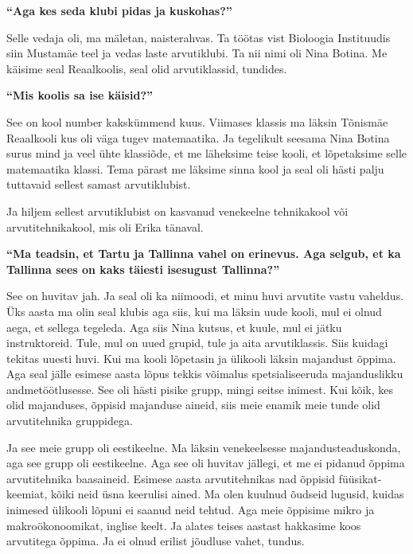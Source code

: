 \textbf{\enquote{Aga kes seda klubi pidas ja kuskohas?}}

Selle vedaja oli, ma mäletan, naisterahvas. Ta töötas vist Bioloogia
Instituudis siin Mustamäe teel ja vedas laste arvutiklubi. Ta nii nimi oli
Nina Botina. Me käisime seal
Reaalkoolis, seal olid arvutiklassid, tundides.

\textbf{\enquote{Mis koolis sa ise käisid?}}

See on kool number kakskümmend kuus. 
Viimases klassis ma läksin Tõnismäe Reaalkooli 
kus oli väga tugev matemaatika. Ja tegelikult seesama Nina Botina surus mind ja 
veel ühte klassiõde, et me läheksime teise kooli, et lõpetaksime selle 
matemaatika klassi. Tema pärast me läksime sinna kool ja seal oli hästi palju  
tuttavaid sellest samast arvutiklubist.

Ja hiljem sellest arvutiklubist on kasvanud venekeelne tehnikakool või
arvutitehnikakool, mis oli Erika tänaval. 

\textbf{\enquote{Ma teadsin, et Tartu ja Tallinna vahel on erinevus. Aga 
selgub, et ka Tallinna sees on kaks täiesti isesugust Tallinna?}}

See on huvitav jah. Ja seal oli ka niimoodi, et minu huvi arvutite vastu 
vaheldus. Üks aasta ma olin seal klubis aga siis, kui ma läksin uude kooli, mul 
ei olnud aega, et  sellega tegeleda. Aga siis Nina kutsus, et kuule,  mul ei 
jätku instruktoreid. Tule, mul on uued grupid, tule ja aita 
arvutiklassis. Siis kuidagi  tekitas uuesti huvi. Kui ma kooli lõpetasin ja  
ülikooli läksin majandust õppima. Aga seal jälle  esimese aasta lõpus tekkis 
võimalus spetsialiseeruda majanduslikku andmetöötlusesse. See oli hästi pisike 
grupp, mingi seitse inimest. Kui kõik, kes olid majanduses, õppisid majanduse 
aineid, siis meie enamik meie tunde olid  arvutitehnika gruppidega.

Ja see meie grupp oli eestikeelne. Ma läksin venekeelsesse majandusteaduskonda, 
aga see grupp oli eestikeelne. Aga
see oli huvitav jällegi, et me ei pidanud õppima arvutitehnika baasaineid. 
Esimese aasta arvutitehnikas nad õppisid füüsikat-keemiat, kõiki neid üsna 
keerulisi ained. Ma olen kuulnud õudseid lugusid, kuidas inimesed ülikooli 
lõpuni ei saanud neid tehtud. Aga meie õppisime mikro ja makroökonoomikat, 
inglise keelt. Ja alates teises aastast hakkasime koos arvutitega õppima. Ja ei 
olnud erilist jõudluse vahet, tundus.

